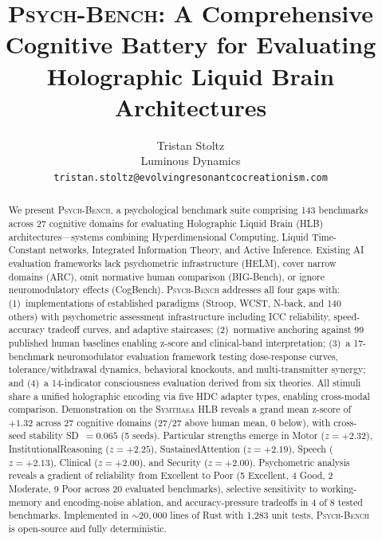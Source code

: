 \documentclass[11pt,letterpaper]{article}
\newcommand{\symthaea}{\textsc{Symthaea}}
\newcommand{\psychbench}{\textsc{Psych-Bench}}
\newcommand{\hlb}{\textsc{HLB}}
\begin{document}
\title{\psychbench{}: A Comprehensive Cognitive Battery for Evaluating\\
Holographic Liquid Brain Architectures}

\author{Tristan Stoltz\\
Luminous Dynamics\\
\texttt{tristan.stoltz@evolvingresonantcocreationism.com}}

\date{}
\maketitle

\begin{abstract}
\noindent
We present \psychbench{}, a psychological benchmark suite comprising 143 benchmarks across 27 cognitive domains for evaluating Holographic Liquid Brain (\hlb{}) architectures---systems combining Hyperdimensional Computing, Liquid Time-Constant networks, Integrated Information Theory, and Active Inference. Existing AI evaluation frameworks lack psychometric infrastructure (HELM), cover narrow domains (ARC), omit normative human comparison (BIG-Bench), or ignore neuromodulatory effects (CogBench). \psychbench{} addresses all four gaps with: (1)~implementations of established paradigms (Stroop, WCST, N-back, and 140 others) with psychometric assessment infrastructure including ICC reliability, speed-accuracy tradeoff curves, and adaptive staircases; (2)~normative anchoring against 99 published human baselines enabling z-score and clinical-band interpretation; (3)~a 17-benchmark neuromodulator evaluation framework testing dose-response curves, tolerance/withdrawal dynamics, behavioral knockouts, and multi-transmitter synergy; and (4)~a 14-indicator consciousness evaluation derived from six theories. All stimuli share a unified holographic encoding via five HDC adapter types, enabling cross-modal comparison. Demonstration on the \symthaea{} \hlb{} reveals a grand mean z-score of $+1.32$ across 27 cognitive domains (27/27 above human mean, 0 below), with cross-seed stability SD~$= 0.065$ (5 seeds). Particular strengths emerge in Motor ($z = +2.32$), InstitutionalReasoning ($z = +2.25$), SustainedAttention ($z = +2.19$), Speech ($z = +2.13$), Clinical ($z = +2.00$), and Security ($z = +2.00$). Psychometric analysis reveals a gradient of reliability from Excellent to Poor (5 Excellent, 4 Good, 2 Moderate, 9 Poor across 20 evaluated benchmarks), selective sensitivity to working-memory and encoding-noise ablation, and accuracy-pressure tradeoffs in 4 of 8 tested benchmarks. Implemented in ${\sim}20{,}000$ lines of Rust with 1,283 unit tests, \psychbench{} is open-source and fully deterministic.
\end{abstract}
\end{document}
